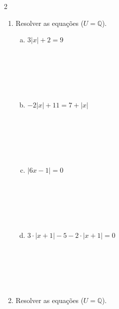 \documentclass[a4paper,14pt]{article}
\begin{document}
\begin{multicols}{2}
\begin{enumerate}
\begin{enumerate}[a)]
				\item $|x| = -8$ \\\\\\\\\\\\
				\item $|x| = \frac{5}{2}$ \\\\\\\\\\\\
				\item $|x| = -1$ \\\\\\\\\\\\
			\end{enumerate}
			\item Resolver as equações ($U = \mathbb{Q}$).
			\begin{enumerate}[a)]
				\item $3|x| + 2 = 9$ \\\\\\\\\\\\
				\item $-2|x| + 11 = 7 + |x|$ \\\\\\\\\\\\
				\item $|6x - 1| = 0$ \\\\\\\\\\\\
				\item $3 \cdot |x + 1| - 5 - 2 \cdot |x + 1| = 0$ \\\\\\\\\\\\
			\end{enumerate}
			\item Resolver as equações ($U = \mathbb{Q}$).

\end{enumerate}
\end{multicols}
\end{document}
